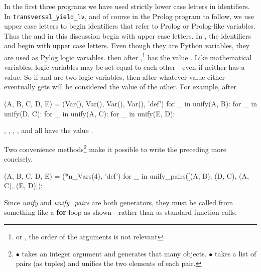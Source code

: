 \begin{sloppypar}
\begin{itemize}[label=$\bullet$]
{In the first three programs we have used strictly lower case letters in identifiers. In \texttt{transversal\_yield\_lv}, and of course in the Prolog program to follow, we use upper case letters to begin identifiers that refer to Prolog or Prolog-like variables. Thus the  and   in this discussion begin with upper case letters. In , the identifiers  and  begin with upper case letters. Even though they are Python variables, they are used as Pylog logic variables.} then after ,\footnote{or , the order of the arguments is not relevant}  has the value . 
Like mathematical variables, logic variables may be set equal to each other---even if neither has a value. So if  and  are two logic variables, then after  whatever value either eventually gets will be considered the value of the other. For example, after
\begin{python}
(A, B, C, D, E) = (Var(), Var(), Var(), Var(), 'def')
for _ in unify(A, B):
  for _ in unify(D, C):
    for _ in unify(A, C):
      for _ in unify(E, D):
\end{python}
, , , , and  all have the value .
\smallv

Two convenience methods\footnote{
$\bullet$  takes an integer argument and generates that many  objects.\newline
$\bullet$  takes a list of pairs (as tuples) and unifies the two elements of each pair.
} 
make it possible to write the preceding more concisely.
\begin{python}
(A, B, C, D, E) = (*n_Vars(4), 'def')
for _ in unify_pairs([(A, B), (D, C), (A, C), (E, D)]):
\end{python}
\smallv
Since \textit{unify} and \textit{unify\_pairs} are both generators, they must be called from something like a \textbf{for} loop as shown---rather than as  standard function calls.
\smallv


\end{itemize}
\end{sloppypar}

